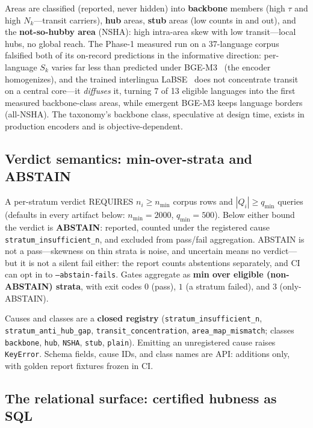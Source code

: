 \documentclass[sigconf, nonacm]{acmart}
\begin{document}
Areas are classified (reported, never hidden) into \textbf{backbone}
members (high $\tau$ and high $N_k$---transit carriers), \textbf{hub}
areas, \textbf{stub} areas (low counts in and out), and the
\textbf{not-so-hubby area} (NSHA): high intra-area skew with low
transit---local hubs, no global reach. The Phase-1 measured run on a
37-language corpus falsified both of its on-record predictions in the
informative direction: per-language $S_k$ varies far less than predicted
under BGE-M3~\cite{xiao2024bge} (the encoder homogenizes), and the trained
interlingua LaBSE~\cite{feng2022labse} does not concentrate transit on a
central core---it \emph{diffuses} it, turning 7 of 13 eligible languages
into the first measured backbone-class areas, while emergent BGE-M3 keeps
language borders (all-NSHA). The taxonomy's backbone class, speculative at
design time, exists in production encoders and is objective-dependent.

\subsection{Verdict semantics: min-over-strata and ABSTAIN}
\label{sec:verdicts}

A per-stratum verdict REQUIRES $n_i \ge n_{\min}$ corpus rows and
$|Q_i| \ge q_{\min}$ queries (defaults in every artifact below:
$n_{\min}=2000$, $q_{\min}=500$). Below either bound the verdict is
\textbf{ABSTAIN}: reported, counted under the registered cause
\texttt{stratum\_insufficient\_n}, and excluded from pass/fail
aggregation. ABSTAIN is not a pass---skewness on thin strata is noise, and
uncertain means no verdict---but it is not a silent fail either: the
report counts abstentions separately, and CI can opt in to
\texttt{--abstain-fails}. Gates aggregate as \textbf{min over eligible
(non-ABSTAIN) strata}, with exit codes $0$ (pass), $1$ (a stratum failed),
and $3$ (only-ABSTAIN).

\begin{sloppypar}
Causes and classes are a \textbf{closed registry}
(\texttt{stratum\_insufficient\_n}, \texttt{stratum\_anti\_hub\_gap},
\texttt{transit\_concentration}, \texttt{area\_map\_mismatch}; classes
\texttt{backbone}, \texttt{hub}, \texttt{NSHA}, \texttt{stub},
\texttt{plain}).
Emitting an unregistered cause raises \texttt{KeyError}. Schema fields,
cause IDs, and class names are API: additions only, with golden report
fixtures frozen in CI.
\end{sloppypar}

\subsection{The relational surface: certified hubness as SQL}
\label{sec:sql}
\end{document}
